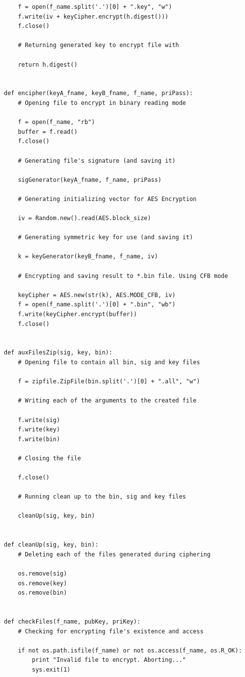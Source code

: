 \documentclass[a4paper,11pt,openright,oneside]{report}
\begin{document}
\begin{appendices}
\begin{verbatim}
    f = open(f_name.split('.')[0] + ".key", "w")
    f.write(iv + keyCipher.encrypt(h.digest()))
    f.close()

    # Returning generated key to encrypt file with

    return h.digest()


def encipher(keyA_fname, keyB_fname, f_name, priPass):
    # Opening file to encrypt in binary reading mode

    f = open(f_name, "rb")
    buffer = f.read()
    f.close()

    # Generating file's signature (and saving it)

    sigGenerator(keyA_fname, f_name, priPass)

    # Generating initializing vector for AES Encryption

    iv = Random.new().read(AES.block_size)

    # Generating symmetric key for use (and saving it)

    k = keyGenerator(keyB_fname, f_name, iv)

    # Encrypting and saving result to *.bin file. Using CFB mode

    keyCipher = AES.new(str(k), AES.MODE_CFB, iv)
    f = open(f_name.split('.')[0] + ".bin", "wb")
    f.write(keyCipher.encrypt(buffer))
    f.close()


def auxFilesZip(sig, key, bin):
    # Opening file to contain all bin, sig and key files

    f = zipfile.ZipFile(bin.split('.')[0] + ".all", "w")

    # Writing each of the arguments to the created file

    f.write(sig)
    f.write(key)
    f.write(bin)

    # Closing the file

    f.close()

    # Running clean up to the bin, sig and key files

    cleanUp(sig, key, bin)


def cleanUp(sig, key, bin):
    # Deleting each of the files generated during ciphering

    os.remove(sig)
    os.remove(key)
    os.remove(bin)


def checkFiles(f_name, pubKey, priKey):
    # Checking for encrypting file's existence and access

    if not os.path.isfile(f_name) or not os.access(f_name, os.R_OK):
        print "Invalid file to encrypt. Aborting..."
        sys.exit(1)


\end{verbatim}
\end{appendices}
\end{document}
